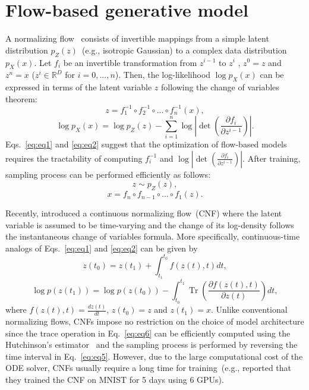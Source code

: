 \documentclass{article}
\DeclareMathOperator{\Tr}{Tr}
\begin{document}
\section{Flow-based generative model}
A normalizing flow~\citep{rezende2015variational} consists of invertible mappings from a simple latent distribution $p_{Z}({z})$~(e.g., isotropic Gaussian) to a complex data distribution $p_{X}({x})$. Let ${f}_{i}$ be an invertible transformation from ${z}^{i-1}$ to ${z}^{i}$ , ${z}^{0} = {z}$ and ${z}^{n} = {x}$ (${z}^{i} \in \mathbb{R}^D$ for $i=0, ... , n$). Then, the log-likelihood $\log p_{X}({x})$ can be expressed in terms of the latent variable ${z}$ following the change of variables theorem:
\begin{equation}
\label{eq:eq1}
{z} =  {f}_{1}^{-1} \circ  {f}_{2}^{-1} \circ ... \circ  {f}_{n}^{-1}({x}),
\end{equation}
\begin{equation}
\label{eq:eq2}
\log p_{X}({x}) = \log p_{Z}({z}) - \sum_{i=1}^{n}\log \left|\det\left(\frac{\partial {f}_{i}}{\partial{z}^{i-1}}\right)\right|.
\end{equation}
Eqs.~\eqref{eq:eq1} and \eqref{eq:eq2} suggest that the optimization of flow-based models requires the tractability of computing ${f}_{i}^{-1}$ and $\log \left|\det\left(\frac{\partial f_{i}}{\partial{z}^{i-1}}\right)\right|$. After training, sampling process can be performed efficiently as follows:
\begin{equation}
\label{eq:eq3}
{z} \sim p_{Z}({z}),
\end{equation}
\begin{equation}
\label{eq:eq4}
{x} =  {f}_{n} \circ {f}_{n-1} \circ ... \circ  {f}_{1}({z}).
\end{equation}

Recently, \citet{chen2018neural} introduced a continuous normalizing flow~(CNF) where the latent variable is assumed to be time-varying and the change of its log-density follows the instantaneous change of variables formula. More specifically, continuous-time analogs of Eqs.~\eqref{eq:eq1} and \eqref{eq:eq2} can be given by
\begin{equation}
\label{eq:eq5}
{z}(t_{0})={z}(t_{1})+\int_{t_{1}}^{t_{0}}{f}({z}(t), t)dt,
\end{equation}
\begin{equation}
\label{eq:eq6}
\log p({z}(t_{1})) = \log p({z}(t_{0})) -\int_{t_{0}}^{t_{1}}\Tr\left(\frac{\partial {f}({z}(t), t)}{\partial {z}(t)}\right)dt,
\end{equation}
where $f(z(t),t)=\frac{dz(t)}{dt}$, ${z}(t_{0})={z}$ and ${z}(t_{1})={x}$. Unlike conventional normalizing flows, CNFs impose no restriction on the choice of model architecture since  the trace operation in Eq.~\eqref{eq:eq6} can be efficiently computed using the Hutchinson's estimator~\citep{grathwohl2018ffjord} and the sampling process is performed by reversing the time interval in Eq.~\eqref{eq:eq5}. However, due to the large computational cost of the ODE solver, CNFs usually require a long time for training~(e.g., \citet{grathwohl2018ffjord} reported that they trained the CNF on MNIST for 5 days using 6 GPUs).
\end{document}

